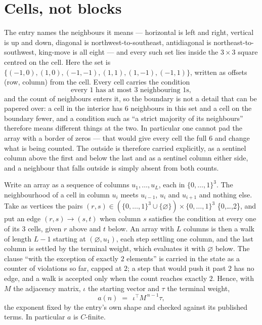 \documentclass[11pt,a4paper]{article}
\theoremstyle{plain}
\theoremstyle{definition}
\begin{document}
\section{Cells, not blocks}

The entry names the neighbours it means --- horizontal is left and right, vertical is up and
down, diagonal is northwest-to-southeast, antidiagonal is northeast-to-southwest, king-move is
all eight --- and every such set lies inside the $3\times3$ square centred on the cell. Here
the set is $\{(-1,0), (1,0), (-1,-1), (1,1), (1,-1), (-1,1)\}$, written as offsets (row, column) from the cell. Every cell carries
the condition
\[
\text{every 1 has at most 3 neighbouring 1s},
\]
and the count of neighbours enters it, so the boundary is not a detail that can be papered
over: a cell in the interior has $6$ neighbours in this set and a cell on the boundary
fewer, and a condition such as ``a strict majority of its neighbours'' therefore means
different things at the two. In particular one cannot pad the array with a border of zeros ---
that would give every cell the full $6$ and change what is being counted. The outside is
therefore carried
explicitly, as a sentinel column above the first and below the last and as a sentinel column
either side, and a neighbour that falls outside is simply absent from both counts.

Write an array as a sequence of columns $u_1,\dots,u_L$, each in
$\{0,\dots,1\}^{3}$. The neighbourhood of a cell in column $u_i$ meets $u_{i-1}$,
$u_i$ and $u_{i+1}$ and nothing else. Take as vertices the pairs
$(r,s)\in(\{0,\dots,1\}^{3}\cup\{\varnothing\})\times\{0,\dots,1\}^{3}$ \times \{0,\dots,2\},
and put an edge $(r,s)\to(s,t)$ when column $s$ satisfies the condition at every one of its
$3$ cells, given $r$ above and $t$ below. An array with $L$ columns is then a walk of length
$L-1$ starting at $(\varnothing,u_1)$, each step settling one column, and the last column is
settled by the terminal weight, which evaluates it with $\varnothing$ below. The clause ``with the exception of exactly $2$ elements'' is carried in
the state as a counter of violations so far, capped at $2$; a step that would push it past
$2$ has no edge, and a walk is accepted only when the count reaches exactly $2$. Hence,
with $M$ the adjacency matrix, $\iota$ the starting vector and $\tau$ the terminal weight,
\[
a(n)\;=\;\,\iota^{\!\top}M^{\,n-1}\tau ,
\]
the exponent fixed by the entry's own shape and checked against its published terms. In
particular $a$ is $C$-finite.
\end{document}
